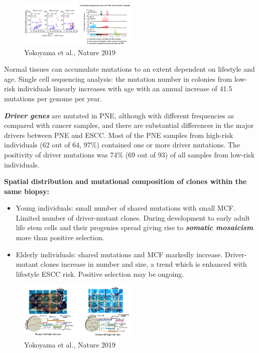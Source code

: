 \begin{figure}
\centering
\includegraphics[width=0.5\textwidth]{../_resources/Screen_Shot_2022-11-04_at_10-51-30.png}
\caption{Yokoyama et al., Nature 2019}
\label{fig:mosaic}
\end{figure}

Normal tissues can accumulate mutations to an extent dependent on lifestyle and age. Single cell sequencing analysis: the mutation number in colonies from low-risk individuals linearly increases with age with an annual increase of 41.5 mutations per genome per year.

\textbf{\emph{Driver genes}} are mutated in PNE, although with different frequencies as compared with
cancer samples, and there are substantial differences in the major drivers between PNE and ESCC. Most of the PNE samples from high-risk individuals (62 out of 64, 97\%) contained one or more driver mutations. The positivity of driver mutations was 74\% (69 out of 93) of all samples from low-risk individuals.

\textbf{Spatial distribution and mutational composition of clones within the same biopsy:}

\begin{itemize}
\tightlist
\item
  Young individuals: small number of shared mutations with small MCF. Limited number of driver-mutant clones. During development to early adult life stem cells and their progenies spread giving rise to \textbf{\emph{somatic mosaicism}} more than positive selection.
\item
  Elderly individuals: shared mutations and MCF markedly increase. Driver-mutant clones increase in number and size, a trend which is enhanced with lifestyle ESCC risk. Positive selection may be ongoing.
\end{itemize}

\begin{figure}
\centering
\includegraphics[width=0.5\textwidth]{../_resources/Screen_Shot_2022-11-04_at_10-59-51.png}
\caption{Yokoyama et al., Nature 2019}
\label{fig:80}
\end{figure}

